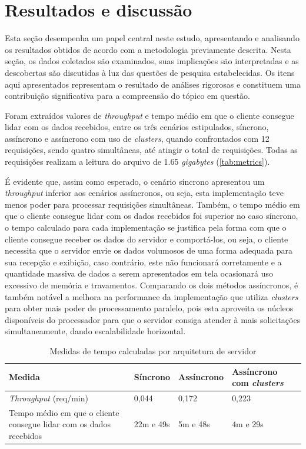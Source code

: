 \documentclass[12pt]{article}
\begin{document}
\section{Resultados e discussão}

Esta seção desempenha um papel central neste estudo, apresentando e analisando os resultados obtidos de 
acordo com a metodologia previamente descrita. Nesta seção, os dados coletados são examinados, suas implicações são interpretadas 
e as descobertas são discutidas à luz das questões de pesquisa estabelecidas. Os itens aqui apresentados representam o 
resultado de análises rigorosas e constituem uma contribuição significativa para a compreensão do tópico em questão.

Foram extraídos valores de \textit{throughput} e tempo médio em que o cliente consegue lidar com os dados recebidos,
entre os três cenários estipulados, síncrono, assíncrono e assíncrono com uso de \textit{clusters}, quando confrontados
com 12 requisições, sendo quatro simultâneas, até atingir o total de requisições. Todas as requisições realizam a leitura
do arquivo de 1.65 \textit{gigabytes} (\autoref{tab:metrics}). 

É evidente que, assim como
esperado, o cenário síncrono apresentou um \textit{throughput} inferior aos cenários assíncronos, ou seja, esta implementação
teve menos poder para processar requisições simultâneas. Também, o tempo médio em que o cliente consegue lidar com os dados recebidos foi superior no caso
síncrono, o tempo calculado para cada implementação se justifica pela forma com que o cliente consegue receber os dados do servidor e comportá-los, ou seja,
o cliente necessita que o servidor envie os dados volumosos de uma forma adequada para sua recepção e exibição, caso contrário, este não funcionará corretamente
e a quantidade massiva de dados a serem apresentados em tela ocasionará uso excessivo de memória e travamentos.
Comparando os dois métodos assíncronos, é também notável a melhora na performance da 
implementação que utiliza \textit{clusters} para obter mais poder de processamento paralelo, pois esta aproveita
os núcleos disponíveis do processador para que o servidor consiga atender à mais solicitações simultaneamente,
dando escalabilidade horizontal.

\begin{table}[H]
\footnotesize
\centering
\caption{Medidas de tempo calculadas por arquitetura de servidor}\label{tab:metrics}
\begin{tabular}{|p{3cm}|p{3cm}|p{3cm}|p{3cm}|}
\hline
\textbf{Medida} & \textbf{Síncrono} & \textbf{Assíncrono} & \textbf{Assíncrono com \textit{clusters}} \\
\hline
\textit{Throughput} (req/min) & 0,044 & 0,172 & 0,223\\
\hline
Tempo médio em que o cliente consegue lidar com os dados recebidos & 22m e 49s & 5m e 48s & 4m e 29s\\
\hline
\end{tabular}
\end{table}
\end{document}
